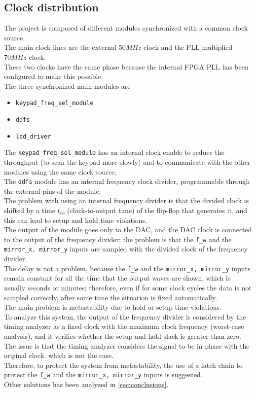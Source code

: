 \subsection{Clock distribution}

The project is composed of different modules synchronized with a common clock source. \\
The main clock lines are the external \(50MHz\) clock and the PLL multiplied \(70MHz\) clock. \\
These two clocks have the same phase because the internal FPGA PLL has been configured to make this possible. \\
The three synchronized main modules are 

\begin{itemize}
    \item \texttt{keypad\_freq\_sel\_module}
    \item \texttt{ddfs}
    \item \texttt{lcd\_driver}
\end{itemize}

\noindent
The \texttt{keypad\_freq\_sel\_module} has an internal clock enable to reduce the throughput (to scan the keypad more slowly) and to communicate with the other modules using the same clock source. \\
The \texttt{ddfs} module has an internal frequency clock divider, programmable through the external pins of the module. \\
The problem with using an internal frequency divider is that the divided clock is shifted by a time \(t_{co}\) (clock-to-output time) of the flip-flop that generates it, and this can lead to setup and hold time violations. \\
The output of the module goes only to the DAC, and the DAC clock is connected to the output of the frequency divider; the problem is that the \texttt{f\_w} and the \texttt{mirror\_x, mirror\_y} inputs are sampled with the divided clock of the frequency divider. \\
The delay is not a problem, because the \texttt{f\_w} and the \texttt{mirror\_x, mirror\_y} inputs remain constant for all the time that the output waves are shown, which is usually seconds or minutes; therefore, even if for some clock cycles the data is not sampled correctly, after some time the situation is fixed automatically. \\
The main problem is metastability due to hold or setup time violations.\\
To analyze this system, the output of the frequency divider is considered by the timing analyzer as a fixed clock with the maximum clock frequency (worst-case analysis), and it verifies whether the setup and hold slack is greater than zero.\\
The issue is that the timing analyzer considers the signal to be in phase with the original clock, which is not the case. \\
Therefore, to protect the system from metastability, the use of a latch chain to protect the \texttt{f\_w} and the \texttt{mirror\_x, mirror\_y} inputs is suggested. \\
Other solutions has been analyzed in \autoref{sec:conclusions}.

\noindent